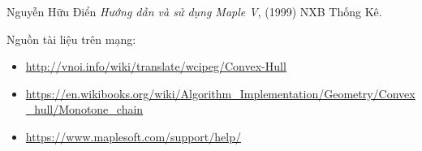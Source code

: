 \documentclass[12pt]{article}
\begin{document}
\newpage
\begin{thebibliography}{99}
%

 Nguyễn Hữu Điển
\textit{Hướng dẫn và sử dụng Maple V},  (1999) NXB Thống Kê.

Nguồn tài liệu trên mạng:  
\begin{itemize}
  \item \url{http://vnoi.info/wiki/translate/wcipeg/Convex-Hull}
  \item \url{https://en.wikibooks.org/wiki/Algorithm_Implementation/Geometry/Convex_hull/Monotone_chain}
  \item \url{https://www.maplesoft.com/support/help/}
\end{itemize}
\end{thebibliography}
\end{document}
